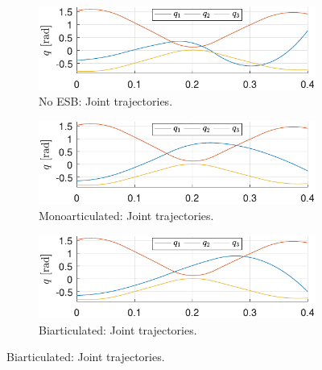 \documentclass[letterpaper, 10 pt, conference]{ieeeconf}  %
\begin{document}
\begin{figure}[ht]
	\begin{subfigure}[t]{0.32\linewidth}
		\includegraphics[width=\linewidth]{noESB/final_traj}
		\caption{No ESB: Joint trajectories.}
		\label{fig:noESB_traj}
	\end{subfigure}
	\begin{subfigure}[t]{0.32\linewidth}
		\includegraphics[width=\linewidth]{mono/final_traj}
		\caption{Monoarticulated: Joint trajectories.}
		\label{fig:mono_traj}
	\end{subfigure}
	\begin{subfigure}[t]{0.32\linewidth}
		\includegraphics[width=\linewidth]{bi/final_traj}
		\caption{Biarticulated: Joint trajectories.}
		\label{fig:bi_traj}
	\end{subfigure}
	
	\vspace{1mm}
	

\end{figure}
\end{document}
